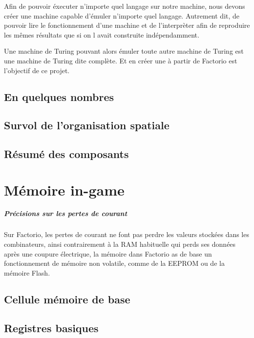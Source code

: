 \documentclass{scrreprt}
\begin{document}
	Afin de pouvoir éxecuter n'importe quel langage sur notre machine, nous devons créer une machine capable d'émuler n'importe quel langage. Autrement dit, de pouvoir lire le fonctionnement d'une machine et de l'interprèter afin de reproduire les mêmes résultats que si on l avait construite indépendamment.
	
	Une machine de Turing pouvant alors émuler toute autre machine de Turing est une machine de Turing dite complète.
	Et en créer une à partir de Factorio est l'objectif de ce projet.
	
	\section{En quelques nombres}
	
	\section{Survol de l'organisation spatiale}
	
	\section{Résumé des composants}
	
	
	
	
	\chapter{Mémoire in-game}
	
	\paragraph{Précisions sur les pertes de courant}
	Sur Factorio, les pertes de courant ne font pas perdre les valeurs stockées dans les combinateurs, ainsi contrairement à la RAM habituelle qui perds ses données après une coupure électrique, la mémoire dans Factorio as de base un fonctionnement de mémoire non volatile, comme de la EEPROM ou de la mémoire Flash.
	
	\section{Cellule mémoire de base}
	
	\section{Registres basiques}
	
\end{document}
